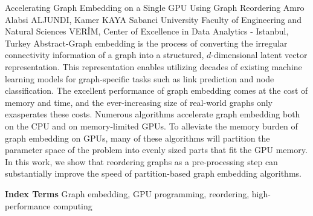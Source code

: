 
    \begin{abstract_online}{Accelerating Graph Embedding on a Single GPU Using Graph Reordering}{%
        Amro Alabsi ALJUNDI, Kamer KAYA}{%
        }{%
        Sabanci University Faculty of Engineering and Natural Sciences \newline \noindent VERİM, Center of Excellence in Data Analytics - Istanbul, Turkey}
    Abstract-Graph embedding is the process of converting the irregular connectivity information of a graph into a structured, $d$-dimensional latent vector representation. This representation enables utilizing decades of existing machine learning models for graph-specific tasks such as link prediction and node classification. The excellent performance of graph embedding comes at the cost of memory and time, and the ever-increasing size of real-world graphs only exasperates these costs. Numerous algorithms accelerate graph embedding both on the CPU and on memory-limited GPUs. To alleviate the memory burden of graph embedding on GPUs, many of these algorithms will partition the parameter space of the problem into evenly sized parts that fit the GPU memory. In this work, we show that reordering graphs as a pre-processing step can substantially improve the speed of partition-based graph embedding algorithms. 
    
            \textbf{Index Terms} \newline{}Graph embedding, GPU programming, reordering, high-performance computing
    \end{abstract_online}
    